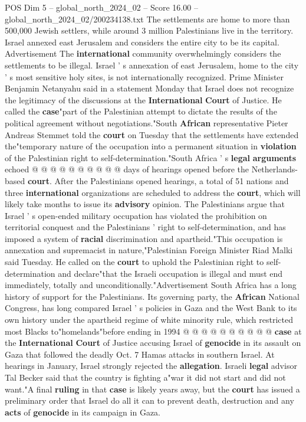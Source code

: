\begin{textsample}{POS Dim 5 – global\_north\_2024\_02 – Score 16.00 – global\_north\_2024\_02/200234138.txt}
The settlements are home to more than 500,000 Jewish settlers, while around 3 million Palestinians live in the territory.
Israel annexed east Jerusalem and considers the entire city to be its capital.
Advertisement The \textbf{international} community overwhelmingly considers the settlements to be illegal.
Israel ' s annexation of east Jerusalem, home to the city ' s most sensitive holy sites, is not internationally recognized.
Prime Minister Benjamin Netanyahu said in a statement Monday that Israel does not recognize the legitimacy of the discussions at the \textbf{International} \textbf{Court} of Justice.
He called the \textbf{case}"part of the Palestinian attempt to dictate the results of the political agreement without negotiations."South \textbf{African} representative Pieter Andreas Stemmet told the \textbf{court} on Tuesday that the settlements have extended the"temporary nature of the occupation into a permanent situation in \textbf{violation} of the Palestinian right to self-determination."South Africa ' s \textbf{legal} \textbf{arguments} echoed @ @ @ @ @ @ @ @ @ @ days of hearings opened before the Netherlands-based \textbf{court}.
After the Palestinians opened hearings, a total of 51 nations and three \textbf{international} organizations are scheduled to address the \textbf{court}, which will likely take months to issue its \textbf{advisory} opinion.
The Palestinians argue that Israel ' s open-ended military occupation has violated the prohibition on territorial conquest and the Palestinians ' right to self-determination, and has imposed a system of \textbf{racial} discrimination and apartheid."This occupation is annexation and supremacist in nature,"Palestinian Foreign Minister Riad Malki said Tuesday.
He called on the \textbf{court} to uphold the Palestinian right to self-determination and declare"that the Israeli occupation is illegal and must end immediately, totally and unconditionally."Advertisement South Africa has a long history of support for the Palestinians.
Its governing party, the \textbf{African} National Congress, has long compared Israel ' s policies in Gaza and the West Bank to its own history under the apartheid regime of white minority rule, which restricted most Blacks to"homelands"before ending in 1994 @ @ @ @ @ @ @ @ @ @ \textbf{case} at the \textbf{International} \textbf{Court} of Justice accusing Israel of \textbf{genocide} in its assault on Gaza that followed the deadly Oct. 7 Hamas attacks in southern Israel.
At hearings in January, Israel strongly rejected the \textbf{allegation}.
Israeli \textbf{legal} advisor Tal Becker said that the country is fighting a"war it did not start and did not want."A final \textbf{ruling} in that \textbf{case} is likely years away, but the \textbf{court} has issued a preliminary order that Israel do all it can to prevent death, destruction and any \textbf{acts} of \textbf{genocide} in its campaign in Gaza.

\end{textsample}

